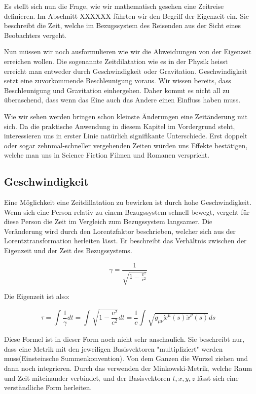 \begin{refsection}
Es stellt sich nun die Frage, wie wir mathematisch gesehen eine Zeitreise definieren. Im Abschnitt XXXXXX führten wir den Begriff der Eigenzeit ein. Sie beschreibt die Zeit, welche im Bezugssystem des Reisenden aus der Sicht eines Beobachters vergeht.

Nun müssen wir noch ausformulieren wie wir die Abweichungen von der Eigenzeit erreichen wollen. Die sogenannte Zeitdilatation wie es in der Physik heisst erreicht man entweder durch Geschwindigkeit oder Gravitation. Geschwindigkeit setzt eine zuvorkommende Beschleunigung voraus. Wir wissen bereits, dass Beschleunigung und Gravitation einhergehen. Daher kommt es nicht all zu \"uberaschend, dass wenn das Eine auch das Andere einen Einfluss haben muss.

Wie wir sehen werden bringen schon kleinste \"Anderungen eine Zeitänderung mit sich. Da die praktische Anwendung in diesem Kapitel im Vordergrund steht, interessieren uns in erster Linie natürlich signifikante Unterschiede. Erst doppelt oder sogar zehnmal-schneller vergehenden Zeiten w\"urden uns Effekte best\"atigen, welche man uns in Science Fiction Filmen und Romanen verspricht.

\subsection{Geschwindigkeit}

Eine M\"oglichkeit eine Zeitdillatation zu bewirken ist durch hohe Geschwindigkeit. Wenn sich eine Person relativ zu einem Bezugssystem schnell bewegt, vergeht f\"ur diese Person die Zeit im Vergleich zum Bezugssystem langsamer. Die Ver\"anderung wird durch den Lorentzfaktor beschrieben, welcher sich aus der Lorentztransformation herleiten l\"asst. Er beschreibt das Verh\"altnis zwischen der Eigenzeit und der Zeit des Bezugssystems.

\begin{equation}
    \gamma=\frac{1}{\sqrt{1-\displaystyle\frac{v^2}{c^2}}} 
\end{equation}

Die Eigenzeit ist also:

\begin{equation}
    \tau
    =
    \int_{}^{}\frac{1}{\gamma}dt=\int_{}^{}\sqrt{1-\frac{v^2}{c^2}}dt
    =
    \frac{1}{c}\int_{}^{}\sqrt{g_{\mu\nu}\dot{x}^{\mu}(s)\dot{x}^{\nu}(s)}ds
\end{equation}

Diese Formel ist in dieser Form noch nicht sehr anschaulich. Sie beschreibt nur, dass eine Metrik mit den jeweiligen Basisvektoren "multipliziert" werden muss(Einsteinsche Summenkonvention). Von dem Ganzen die Wurzel ziehen und dann noch integrieren.
Durch das verwenden der Minkowski-Metrik, welche Raum und Zeit miteinander verbindet, und der Basisvektoren $t, x, y, z$ l\"asst sich eine verst\"andliche Form herleiten. 


\end{refsection}
